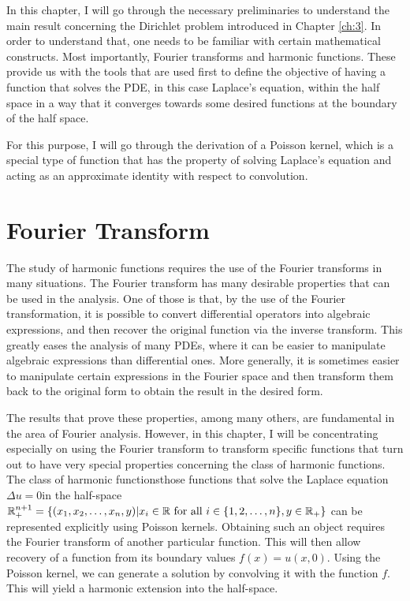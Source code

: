 In this chapter, I will go through the necessary preliminaries to understand the main result concerning the Dirichlet problem introduced in Chapter \ref{ch:3}. In order to understand that, one needs to be familiar with certain mathematical constructs. Most importantly, Fourier transforms and harmonic functions. These provide us with the tools that are used first to define the objective of having a function that solves the PDE, in this case Laplace's equation, within the half space in a way that it converges towards some desired functions at the boundary of the half space.

For this purpose, I will go through the derivation of a Poisson kernel, which is a special type of function that has the property of solving Laplace's equation and acting as an approximate identity with respect to convolution.

\section{Fourier Transform}

The study of harmonic functions requires the use of the Fourier transforms in many situations. The Fourier transform has many desirable properties that can be used in the analysis. One of those is that, by the use of the Fourier transformation, it is possible to convert differential operators into algebraic expressions, and then recover the original function via the inverse transform. This greatly eases the analysis of many PDEs, where it can be easier to manipulate algebraic expressions than differential ones. More generally, it is sometimes easier to manipulate certain expressions in the Fourier space and then transform them back to the original form to obtain the result in the desired form.

The results that prove these properties, among many others, are fundamental in the area of Fourier analysis. However, in this chapter, I will be concentrating especially on using the Fourier transform to transform specific functions that turn out to have very special properties concerning the class of harmonic functions. The class of harmonic functions\textemdash those functions that solve the Laplace equation $\Delta u=0$\textemdash  in the half-space $\mathbb R_+^{n+1}=\{(x_1,x_2,\ldots,x_n,y)|x_i\in\mathbb R\text{ for all }i\in\{1,2,\ldots,n\}, y\in\mathbb R_+\}$ can be represented explicitly using Poisson kernels. Obtaining such an object requires the Fourier transform of another particular function. This will then allow recovery of a function from its boundary values $f(x)=u(x,0)$. Using the Poisson kernel, we can generate a solution by convolving it with the function $f$. This will yield a harmonic extension into the half-space.

